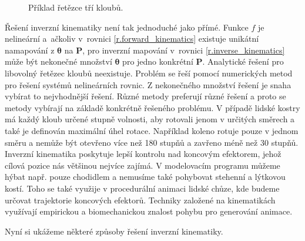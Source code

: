 \begin{figure}[h]
\begin{center}
\caption{Příklad řetězce tří kloubů.} \label{ik_chain}
\end{center}
\end{figure}
Řešení inverzní kinematiky není tak jednoduché jako přímé. Funkce $f$ je nelineární a~ačkoliv v~rovnici \ref{r.forward_kinematics} existuje unikátní namapování z $\boldsymbol{\theta}$ na $\mathbf{P}$, pro inverzní mapování v~rovnici \ref{r.inverse_kinematics} může být nekonečné množství $\boldsymbol{\theta}$ pro jedno konkrétní $\mathbf{P}$. Analytické řešení pro libovolný řetězec kloubů neexistuje. Problém se řeší pomocí numerických metod pro řešení systémů nelineárních rovnic. Z nekonečného množství řešení je snaha vybírat to nejvhodnější řešení. Různé metody preferují různé řešení a proto se metody vybírají na základě konkrétně řešeného problému. V případě lidské kostry má každý kloub určené stupně volnosti, aby rotovali jenom v určitých směrech a také je definován maximální úhel rotace. Například koleno rotuje pouze v jednom směru a nemůže být otevřeno více než 180 stupňů a zavřeno méně než 30 stupňů. Inverzní kinematika poskytuje lepší kontrolu nad koncovým efektorem, jehož cílová pozice nás většinou nejvíce zajímá. V modelovacím programu můžeme hýbat např. pouze chodidlem a nemusíme také pohybovat stehenní a lýtkovou kostí. Toho se také využije v procedurální animaci lidské chůze, kde budeme určovat trajektorie koncových efektorů. Techniky založené na kinematikách využívají empirickou a biomechanickou znalost pohybu pro generování animace. 

Nyní si ukážeme některé způsoby řešení inverzní kinematiky.
